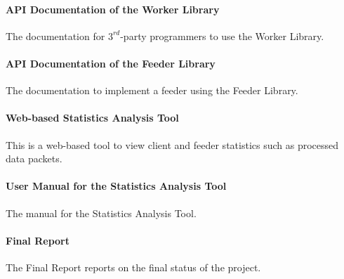 \paragraph{API Documentation of the Worker Library} The documentation for $3^{rd}$-party programmers to use the Worker Library.
\paragraph{API Documentation of the Feeder Library} The documentation to implement a feeder using the Feeder Library.
\paragraph{Web-based Statistics Analysis Tool} This is a web-based tool to view client and feeder statistics such as processed data packets.
\paragraph{User Manual for the Statistics Analysis Tool} The manual for the Statistics Analysis Tool.
\paragraph{Final Report} The Final Report reports on the final status of the project.

